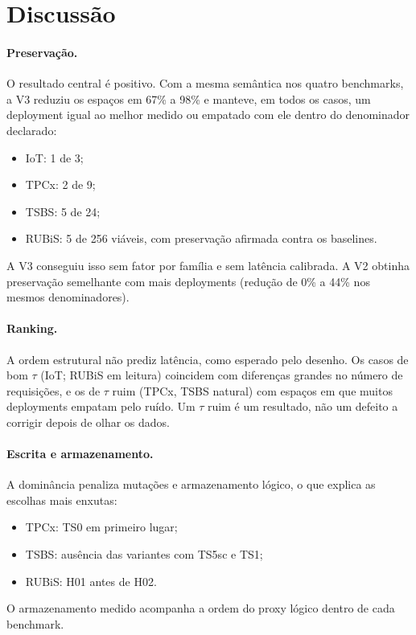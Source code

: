 \documentclass[10pt,a4paper,twoside]{article}
\theoremstyle{definition}\newtheorem{definicao}{Definição}
\begin{document}
\section{Discussão}
\label{sec:discussao}

\paragraph{Preservação.}
O resultado central é positivo. Com a mesma semântica nos quatro benchmarks, a V3 reduziu os espaços em 67\% a 98\% e
manteve, em todos os casos, um deployment igual ao melhor medido ou empatado com ele dentro do denominador declarado:
\begin{itemize}
\item IoT: 1 de 3;
\item TPCx: 2 de 9;
\item TSBS: 5 de 24;
\item RUBiS: 5 de 256 viáveis, com preservação afirmada contra os baselines.
\end{itemize}
A V3 conseguiu isso sem fator por família e sem latência calibrada. A V2 obtinha preservação semelhante com mais
deployments (redução de 0\% a 44\% nos mesmos denominadores).

\paragraph{Ranking.}
A ordem estrutural não prediz latência, como esperado pelo desenho. Os casos de bom $\tau$ (IoT; RUBiS em leitura)
coincidem com diferenças grandes no número de requisições, e os de $\tau$ ruim (TPCx, TSBS natural) com espaços em que
muitos deployments empatam pelo ruído. Um $\tau$ ruim é um resultado, não um defeito a corrigir depois de olhar os
dados.

\paragraph{Escrita e armazenamento.}
A dominância penaliza mutações e armazenamento lógico, o que explica as escolhas mais enxutas:
\begin{itemize}
\item TPCx: TS0 em primeiro lugar;
\item TSBS: ausência das variantes com TS5sc e TS1;
\item RUBiS: H01 antes de H02.
\end{itemize}
O armazenamento medido acompanha a ordem do proxy lógico dentro de cada benchmark.
\end{document}
